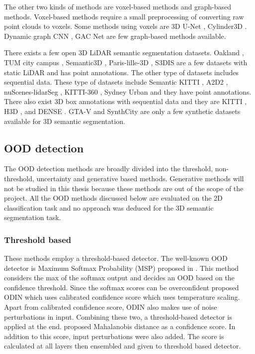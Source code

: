 \documentclass[thesis]{mas_proposal}
\begin{document}
The other two kinds of methods are voxel-based methods and graph-based methods. 
Voxel-based methods require a small preprocessing of converting raw point clouds to voxels.
Some methods using voxels are 3D U-Net \cite{3Dmininet}, Cylinder3D \cite{zhou2020cylinder3d}. 
Dynamic graph CNN \cite{dyn_graph_cnn}, GAC Net \cite{Wang_2019_CVPR_GACNet} are few graph-based methods available.

There exists a few open 3D LiDAR semantic segmentation datasets. 
Oakland \cite{oakland}, TUM city campus \cite{gehrung2017approach_tum_campus}, Semantic3D \cite{hackel2017semantic3d}, Paris-lille-3D \cite{roynard2018paris}, S3DIS \cite{Armeni_2016_CVPR_S3DIS} are a few datasets with static LiDAR and has point annotations.
The other type of datasets includes sequential data.
These type of datasets include Semantic KITTI \cite{Behley_2019_ICCV}, A2D2 \cite{geyer2020a2d2}, nuScenes-lidarSeg \cite{caesar2020nuscenes}, KITTI-360 \cite{Xie_2016_CVPR_KITTI_360}, Sydney Urban \cite{de2013unsupervised} and they have point annotations.
There also exist 3D box annotations with sequential data and they are KITTI \cite{KITTI}, H3D \cite{H3D}, and DENSE \cite{Bijelic_2020_CVPR_DENSE}. %
GTA-V \cite{GTAV} and SynthCity \cite{griffiths2019synthcity} are only a few synthetic datasets available for 3D semantic segmentation.

\subsection{OOD detection}
The OOD detection methods are broadly divided into the threshold, non-threshold, uncertainty and generative based methods.
Generative methods will not be studied in this thesis because these methods are out of the scope of the project.
All the OOD methods discussed below are evaluated on the 2D classification task and no approach was deduced for the 3D semantic segmentation task.
\subsubsection{Threshold based}
These methods employ a threshold-based detector.
The well-known OOD detector is Maximum Softmax Probability (MSP) proposed in \cite{hendrycks2016baseline_MSP}. 
This method considers the max of the softmax output and decides an OOD based on the confidence threshold.
Since the softmax scores can be overconfident \cite{liang2017enhancing_ODIN} proposed ODIN which uses calibrated confidence score which uses temperature scaling.
Apart from calibrated confidence score, ODIN also makes use of noise perturbations in input.
Combining these two, a threshold-based detector is applied at the end. 
\cite{lee2018simple_mahalanobis} proposed Mahalanobis distance as a confidence score. 
In addition to this score, input perturbations were also added. 
The score is calculated at all layers then ensembled and given to threshold based detector.
\end{document}
